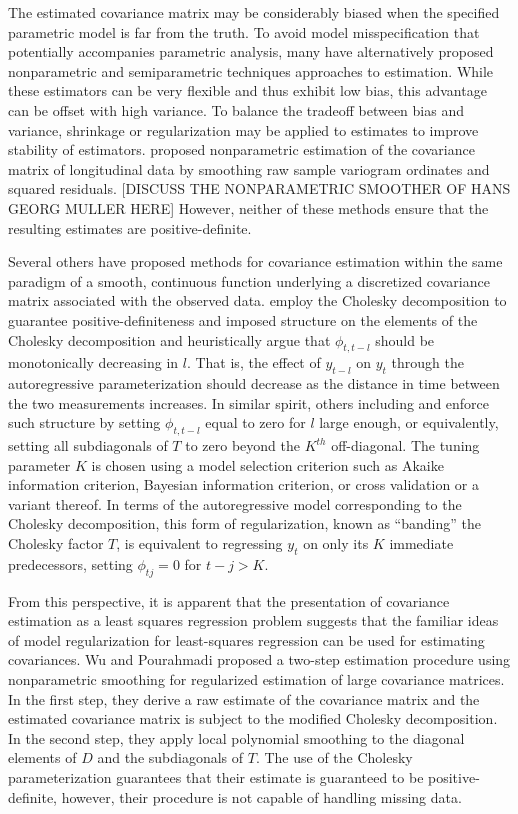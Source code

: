 \documentclass[12pt]{article}
\theoremstyle{definition}
\begin{document}
{{{{\bigskip

The estimated covariance matrix may be considerably biased when the specified parametric model is far from the truth.  To avoid model misspecification that potentially accompanies parametric analysis, many have alternatively  proposed nonparametric and semiparametric techniques approaches to estimation.  While these estimators can be very flexible and thus exhibit low bias, this advantage can be offset with high variance.  To balance the tradeoff between bias and variance, shrinkage or regularization may be applied to estimates to improve stability of estimators. \citet{diggle1998nonparametric} proposed nonparametric estimation of the covariance matrix of longitudinal data by smoothing raw sample variogram ordinates and squared residuals.  [DISCUSS THE NONPARAMETRIC SMOOTHER OF HANS GEORG MULLER HERE]  However, neither of these methods ensure that the resulting estimates are positive-definite.  

\bigskip
Several others have proposed methods for covariance estimation within the same paradigm of a smooth, continuous function underlying a discretized covariance matrix associated with the observed data.   \citet{pourahmadi1999joint} employ the Cholesky decomposition to guarantee positive-definiteness and imposed structure on the elements of the Cholesky decomposition and heuristically argue that $\phi_{t,t-l}$ should be monotonically decreasing in $l$. That is, the effect of $y_{t-l}$ on $y_t$ through the autoregressive parameterization should decrease as the distance in time between the two measurements increases. In similar spirit, others including \citet{bickel2008regularized} and \citet{levina2008sparse} enforce such structure by setting $\phi_{t,t-l}$ equal to zero for $l$ large enough, or equivalently, setting all subdiagonals of $T$ to zero beyond the $K^{th}$ off-diagonal. The tuning parameter $K$ is chosen using a model selection criterion such as Akaike information criterion, Bayesian information criterion, or cross validation or a variant thereof.  In terms of the autoregressive model corresponding to the Cholesky decomposition, this form of regularization, known as ``banding'' the Cholesky factor $T$, is equivalent to regressing $y_t$ on only its $K$ immediate predecessors, setting $\phi_{tj} = 0$ for $t-j>K$. 

\bigskip

From this perspective, it is apparent that the presentation of covariance estimation as a least squares regression problem suggests that the familiar ideas of model regularization for least-squares regression can be used for estimating covariances.  Wu and Pourahmadi \citet{wu2003nonparametric} proposed a two-step estimation procedure using nonparametric smoothing for regularized estimation of large covariance matrices.  In the first step, they derive a raw estimate of the covariance matrix and the estimated covariance matrix is subject to the modified Cholesky decomposition. In the second step, they apply local polynomial smoothing to the diagonal elements of $D$ and the subdiagonals of $T$. The use of the Cholesky parameterization guarantees that their estimate is guaranteed to be positive-definite, however, their procedure is not capable of handling missing data. \citet{huang2007estimation} 

}}}}
\end{document}
